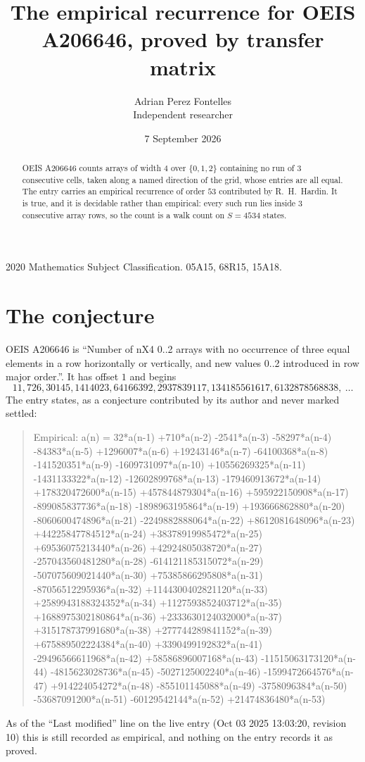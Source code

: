 \documentclass[11pt,a4paper]{article}
\title{The empirical recurrence for OEIS A206646, proved by transfer matrix}
\author{Adrian Perez Fontelles\\ \small Independent researcher}
\date{7 September 2026}
\theoremstyle{plain}
\theoremstyle{definition}
\begin{document}
\maketitle

\begin{abstract}
OEIS A206646 counts arrays of width $4$ over $\{0,1,2\}$ containing no run of $3$ consecutive
cells, taken along a named direction of the grid, whose entries are all equal. The entry carries
an empirical recurrence of order $53$ contributed by R.~H.~Hardin. It is true, and it is
decidable rather than empirical: every such run lies inside $3$ consecutive array rows, so
the count is a walk count on $S=4534$ states.
\end{abstract}

\noindent\small 2020 Mathematics Subject Classification. 05A15, 68R15, 15A18.\normalsize

\section{The conjecture}

OEIS A206646 is ``Number of nX4 0..2 arrays with no occurrence of three equal elements in a row horizontally or vertically, and new values 0..2 introduced in row major order.''. It has offset $1$ and begins
\[
11, 726, 30145, 1414023, 64166392, 2937839117, 134185561617, 6132878568838,\ \dots
\]
The entry states, as a conjecture contributed by its author and never marked settled:
\begin{quote}
Empirical: a(n) = 32*a(n-1) +710*a(n-2) -2541*a(n-3) -58297*a(n-4) -84383*a(n-5) +1296007*a(n-6) +19243146*a(n-7) -64100368*a(n-8) -141520351*a(n-9) -1609731097*a(n-10) +10556269325*a(n-11) -1431133322*a(n-12) -12602899768*a(n-13) -179460913672*a(n-14) +178320472600*a(n-15) +457844879304*a(n-16) +595922150908*a(n-17) -899085837736*a(n-18) -1898963195864*a(n-19) +193666862880*a(n-20) -8060600474896*a(n-21) -2249882888064*a(n-22) +8612081648096*a(n-23) +44225847784512*a(n-24) +38378919985472*a(n-25) +69536075213440*a(n-26) +42924805038720*a(n-27) -257043560481280*a(n-28) -614121185315072*a(n-29) -507075609021440*a(n-30) +75385866295808*a(n-31) -87056512295936*a(n-32) +1144300402821120*a(n-33) +2589943188324352*a(n-34) +1127593852403712*a(n-35) +1688975302180864*a(n-36) +2333630124032000*a(n-37) +315178737991680*a(n-38) +277744289841152*a(n-39) +675889502224384*a(n-40) +3390499192832*a(n-41) -29496566611968*a(n-42) +58586896007168*a(n-43) -11515063173120*a(n-44) -4815623028736*a(n-45) -5027125002240*a(n-46) -1599472664576*a(n-47) +914224054272*a(n-48) -855101145088*a(n-49) -3758096384*a(n-50) -53687091200*a(n-51) -60129542144*a(n-52) +21474836480*a(n-53)
\end{quote}
As of the ``Last modified'' line on the live entry (Oct 03 2025 13:03:20, revision 10) this is still
recorded as empirical, and nothing on the entry records it as proved.
\end{document}
